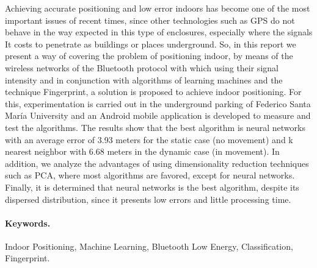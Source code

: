 
Achieving accurate positioning and low error indoors has become one of the most important issues of recent times, since other technologies such as GPS do not behave in the way expected in this type of enclosures, especially where the signals It costs to penetrate as buildings or places underground. So, in this report we present a way of covering the problem of positioning indoor, by means of the wireless networks of the Bluetooth protocol with which using their signal intensity and in conjunction with algorithms of learning machines and the technique Fingerprint, a solution is proposed to achieve indoor positioning. For this, experimentation is carried out in the underground parking of Federico Santa María University and an Android mobile application is developed to measure and test the algorithms. The results show that the best algorithm is neural networks with an average error of 3.93 meters for the static case (no movement) and k nearest neighbor with 6.68 meters in the dynamic case (in movement). In addition, we analyze the advantages of using dimensionality reduction techniques such as PCA, where most algorithms are favored, except for neural networks. Finally, it is determined that neural networks is the best algorithm, despite its dispersed distribution, since it presents low errors and little processing time.

\vspace{20mm}

\paragraph{Keywords.}

Indoor Positioning, Machine Learning, Bluetooth Low Energy, Classification, Fingerprint.

\vspace{20mm}